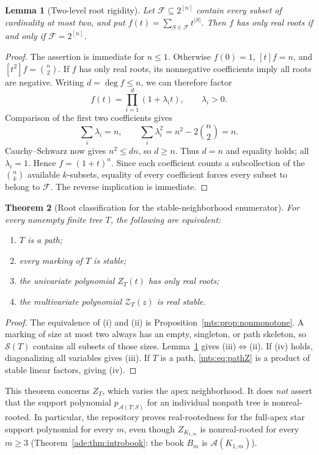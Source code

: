\documentclass[11pt]{article}
\numberwithin{equation}{section}
\newtheorem{theorem}{Theorem}[section]
\newtheorem{lemma}[theorem]{Lemma}
\theoremstyle{definition}
\newcommand{\calA}{\mathcal A}
\newcommand{\Stab}{\mathcal S}
\newcommand{\Zpoly}{\mathcal Z}
\begin{document}
\begin{lemma}[Two-level root rigidity]\label{mts:lem:rigidity}
Let $\mathcal F\subseteq2^{[n]}$ contain every subset of cardinality at
most two, and put $f(t)=\sum_{S\in\mathcal F}t^{|S|}$. Then $f$ has only
real roots if and only if $\mathcal F=2^{[n]}$.
\end{lemma}
\begin{proof}
The assertion is immediate for $n\le1$. Otherwise $f(0)=1$, $[t]f=n$,
and $[t^2]f=\binom n2$. If $f$ has only real roots, its nonnegative
coefficients imply all roots are negative. Writing $d=\deg f\le n$, we
can therefore factor
\[
 f(t)=\prod_{i=1}^d(1+\lambda_i t),\qquad\lambda_i>0.
\]
Comparison of the first two coefficients gives
\[
 \sum_i\lambda_i=n,\qquad
 \sum_i\lambda_i^2=n^2-2\binom n2=n.
\]
Cauchy--Schwarz now gives $n^2\le dn$, so $d\ge n$. Thus $d=n$ and
equality holds; all $\lambda_i=1$. Hence $f=(1+t)^n$. Since each
coefficient counts a subcollection of the $\binom nk$ available
$k$-subsets, equality of every coefficient forces every subset to belong
to $\mathcal F$. The reverse implication is immediate.
\end{proof}

\begin{theorem}[Root classification for the stable-neighborhood enumerator]\label{mts:thm:Zroots}
For every nonempty finite tree $T$, the following are equivalent:
\begin{enumerate}[label=(\roman*)]
\item $T$ is a path;
\item every marking of $T$ is stable;
\item the univariate polynomial $Z_T(t)$ has only real roots;
\item the multivariate polynomial $\Zpoly_T(z)$ is real stable.
\end{enumerate}
\end{theorem}
\begin{proof}
The equivalence of (i) and (ii) is Proposition~\ref{mts:prop:nonmonotone}. A marking of
size at most two always has an empty, singleton, or path skeleton, so
$\Stab(T)$ contains all subsets of those sizes. Lemma~\ref{mts:lem:rigidity} gives
(iii)$\Leftrightarrow$(ii). If (iv) holds, diagonalizing all variables
gives (iii). If $T$ is a path, \eqref{mts:eq:pathZ} is a product of stable
linear factors, giving (iv).
\end{proof}

This theorem concerns $Z_T$, which varies the apex neighborhood. It does
\emph{not} assert that the support polynomial $p_{\calA(T;S)}$ for an
individual nonpath tree is nonreal-rooted. In particular, the repository
proves real-rootedness for the full-apex star support polynomial for every
$m$, even though $Z_{K_{1,m}}$ is nonreal-rooted for every $m\ge3$
(Theorem~\ref{ade:thm:introbook}: the book $B_m$ is $\calA(K_{1,m})$).
\end{document}
